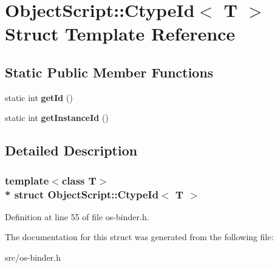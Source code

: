 \hypertarget{struct_object_script_1_1_ctype_id}{}\section{Object\+Script\+:\+:Ctype\+Id$<$ T $>$ Struct Template Reference}
\label{struct_object_script_1_1_ctype_id}
\subsection*{Static Public Member Functions}
\begin{DoxyCompactItemize}
\item 
static int {\bfseries get\+Id} ()\hypertarget{struct_object_script_1_1_ctype_id_a08c1a82c359dea298850d214bb9e81f6}{}\label{struct_object_script_1_1_ctype_id_a08c1a82c359dea298850d214bb9e81f6}

\item 
static int {\bfseries get\+Instance\+Id} ()\hypertarget{struct_object_script_1_1_ctype_id_a73f968c85e3a01f941908ccc96061cd6}{}\label{struct_object_script_1_1_ctype_id_a73f968c85e3a01f941908ccc96061cd6}

\end{DoxyCompactItemize}


\subsection{Detailed Description}
\subsubsection*{template$<$class T$>$\\*
struct Object\+Script\+::\+Ctype\+Id$<$ T $>$}



Definition at line 55 of file os-\/binder.\+h.



The documentation for this struct was generated from the following file\+:\begin{DoxyCompactItemize}
\item 
src/os-\/binder.\+h\end{DoxyCompactItemize}
